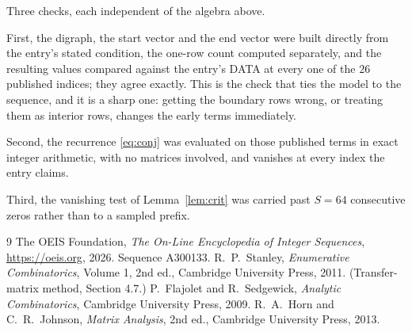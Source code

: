 \documentclass[11pt,a4paper]{article}
\theoremstyle{plain}
\theoremstyle{definition}
\begin{document}
Three checks, each independent of the algebra above.

First, the digraph, the start vector and the end vector were built directly from the
entry's stated condition, the one-row count computed separately, and the resulting values
compared against the entry's DATA at every one of the $26$ published indices; they
agree exactly. This is the check that ties the model to the sequence, and it is a sharp one:
getting the boundary rows wrong, or treating them as interior rows, changes the early terms
immediately.

Second, the recurrence \eqref{eq:conj} was evaluated on those published terms in exact
integer arithmetic, with no matrices involved, and vanishes at every index the entry claims.

Third, the vanishing test of Lemma~\ref{lem:crit} was carried past $S=64$ consecutive
zeros rather than to a sampled prefix.

\begin{thebibliography}{9}
 The OEIS Foundation, \emph{The On-Line Encyclopedia of Integer
Sequences}, \url{https://oeis.org}, 2026. Sequence A300133.
 R.~P.~Stanley, \emph{Enumerative Combinatorics}, Volume 1, 2nd ed.,
Cambridge University Press, 2011. (Transfer-matrix method, Section 4.7.)
 P.~Flajolet and R.~Sedgewick, \emph{Analytic Combinatorics}, Cambridge
University Press, 2009.
 R.~A.~Horn and C.~R.~Johnson, \emph{Matrix Analysis}, 2nd ed., Cambridge
University Press, 2013.
\end{thebibliography}
\end{document}
